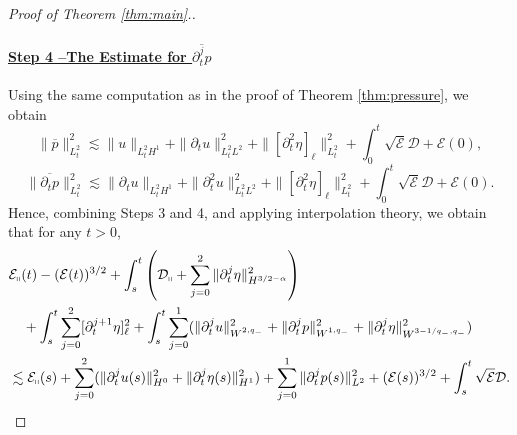 \documentclass[letterpaper,reqno,10pt,twoside]{amsart}
\theoremstyle{definition}
\theoremstyle{remark}
\def\p{\partial}
\begin{document}
\begin{proof}[Proof of Theorem \ref{thm:main}.]
			\paragraph{\underline{Step 4 --The Estimate for $\overline{\p_{t}^{j}p}$}}
			
			Using the same computation as in the proof of Theorem \ref{thm:pressure}, we obtain
			\[
			\|\overline{p}\|^{2}_{L_{t}^{2}}\lesssim \|u\|_{L_{t}^{2}H^{1}}+\|\p_{t}u\|^{2}_{L_{t}^{2}L^{2}}+\|[\p_{t}^{2}\eta]_{\ell}\|^{2}_{L_{t}^{2}}+\int_{0}^{t}\sqrt{\mathcal{E}}\mathcal{D}+\mathcal{E}(0),
			\]
			\[ \|\overline{\p_{t}p}\|^{2}_{L_{t}^{2}}\lesssim \|\p_{t}u\|_{L_{t}^{2}H^{1}}+\|\p_{t}^{2}u\|^{2}_{L_{t}^{2}L^{2}}+\|[\p_{t}^{2}\eta]_{\ell}\|^{2}_{L_{t}^{2}}+\int_{0}^{t}\sqrt{\mathcal{E}}\mathcal{D}+\mathcal{E}(0).
			\]
			Hence, combining  Steps 3 and 4, and applying interpolation theory, we obtain that for any $t>0$,
			\[
			\begin{aligned}  &\mathcal{E}_\shortparallel(t)-(\mathcal{E}(t))^{3/2}+\int_s^t\left(\mathcal{D}_\shortparallel+\sum_{j=0}^2\|\p_t^{j}\eta\|_{H^{3/2-\alpha}}^2\right)\\
				&\quad+\int_s^t\sum_{j=0}^2[\p_t^{j+1}\eta]_\ell^2+\int_s^t\sum_{j=0}^{1}(\|\p_t^{j}u\|_{W^{2,q_-}}^2+\|\p_t^{j}p\|_{W^{1,q_-}}^2+\|\p_t^{j}\eta\|_{W^{3-1/q_-,q_-}}^2)\\
				&\lesssim\mathcal{E}_\shortparallel(s)+\sum_{j=0}^2(\|\p_t^ju(s)\|_{H^0}^2+\|\p_t^j\eta(s)\|_{H^1}^2)+\sum_{j=0}^{1}\|\p_{t}^{j}p(s)\|^{2}_{L^{2}}+(\mathcal{E}(s))^{3/2}+\int_s^t\sqrt{\mathcal{E}}\mathcal{D}.
			\end{aligned}\]
			

\end{proof}
\end{document}
